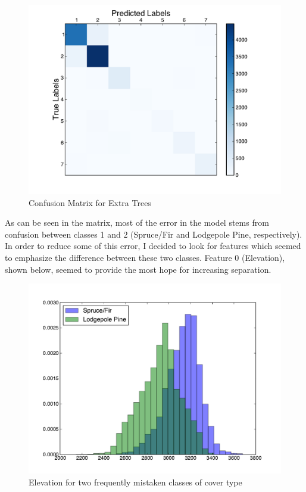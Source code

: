 \documentclass[letter,12pt]{report}
\begin{document}
\begin{figure}[!ht]
\centering
\includegraphics[scale=0.55]{extra_trees_cm.pdf}
\caption{Confusion Matrix for Extra Trees}
\label{fig:extra}
\end{figure} 

As can be seen in the matrix, most of the error in the model stems from confusion between classes 1 and 2 (Spruce/Fir and Lodgepole Pine, respectively).  In order to reduce some of this error, I decided to look for features which seemed to emphasize the difference between these two classes.  Feature 0 (Elevation), shown below, seemed to provide the most hope for increasing separation.  

\begin{figure}[!ht]
\centering
\includegraphics[scale=0.5]{feature0.pdf}
\caption{Elevation for two frequently mistaken classes of cover type}
\label{fig:extra}
\end{figure} 
\end{document}
